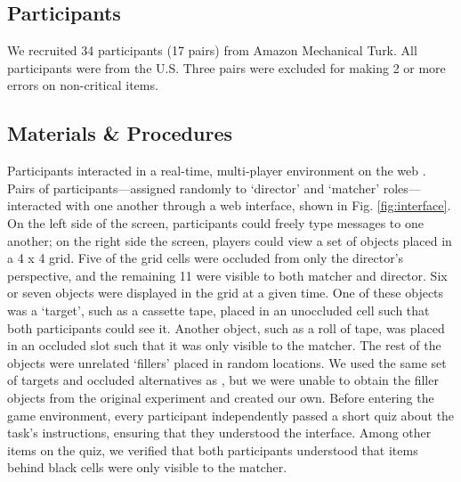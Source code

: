 \documentclass[10pt,letterpaper]{article}
\begin{document}
\subsection{Participants}

We recruited 34 participants (17 pairs) from Amazon Mechanical Turk. All participants were from the U.S. Three pairs were excluded for making 2 or more errors on non-critical items.

\subsection{Materials \& Procedures}


Participants interacted in a real-time, multi-player environment on the web \cite{Hawkins15_RealTimeWebExperiments}. 
Pairs of participants---assigned randomly to `director' and `matcher' roles---interacted with one another through a web interface, shown in Fig. \ref{fig:interface}. On the left side of the screen, participants could freely type messages to one another; on the right side the screen, players could view a set of objects placed in a 4 x 4 grid. Five of the grid cells were occluded from only the director's perspective, and the remaining 11 were visible to both matcher and director. Six or seven objects were displayed in the grid at a given time. One of these objects was a `target', such as a cassette tape, placed in an unoccluded cell such that both participants could see it. Another object, such as a roll of tape, was placed in an occluded slot such that it was only visible to the matcher. The rest of the objects were unrelated `fillers' placed in random locations. We used the same set of targets and occluded alternatives as , but we were unable to obtain the filler objects from the original experiment and created our own.
Before entering the game environment, every participant independently passed a short quiz about the task's instructions, ensuring that they understood the interface. Among other items on the quiz, we verified that both participants understood that items behind black cells were only visible to the matcher. 
\end{document}

